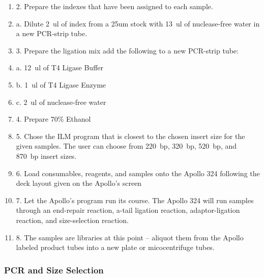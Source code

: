 \documentclass[graybox]{svmult}
\begin{document}
\begin{enumerate}
\item{2.      Prepare the indexes that have been assigned to each sample.}
\item{a.      Dilute 2~ul of index from a 25um stock with 13~ul of nuclease-free water in a new PCR-strip tube.}
\item{3.      Prepare the ligation mix add the following to a new PCR-strip tube:}
\item{a.      12~ul of T4 Ligase Buffer}
\item{b.      1~ul of T4 Ligase Enzyme}
\item{c.      2~ul of nuclease-free water}
\item{4.      Prepare 70\% Ethanol}
\item{5.      Chose the ILM program that is closest to the chosen insert size for the given samples. The user can choose from 220~bp, 320~bp, 520~bp, and 870~bp insert sizes.}
\item{6.      Load consumables, reagents, and samples onto the Apollo 324 following the deck layout given on the Apollo’s screen}
\item{7.      Let the Apollo’s program run its course. The Apollo 324 will run samples through an end-repair reaction, a-tail ligation reaction, adaptor-ligation reaction, and size-selection reaction.}
\item{8.      The samples are libraries at this point – aliquot them from the Apollo labeled product tubes into a new plate or micocentrifuge tubes.}
\end{enumerate}

\subsubsection{PCR and Size Selection}
\end{document}
